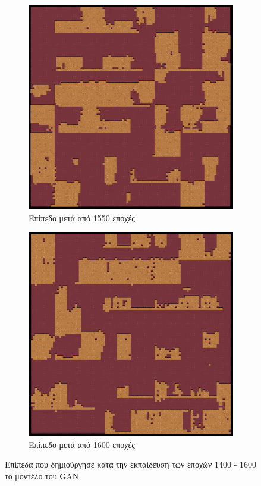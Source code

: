 \begin{figure}[H]
\begin{subfigure}{.5\textwidth}
  \centering
  \includegraphics[width=.8\linewidth]{../images/generated/1550.png}
  \caption{Επίπεδο μετά από 1550 εποχές}
  \label{fig:sfig2}
\end{subfigure}
\begin{subfigure}{.5\textwidth}
  \centering
  \includegraphics[width=.8\linewidth]{../images/generated/1600.png}
  \caption{Επίπεδο μετά από 1600 εποχές}
  \label{fig:sfig2}
\end{subfigure}
\caption{Επίπεδα που δημιούργησε κατά την εκπαίδευση των εποχών 1400 - 1600 το μοντέλο του GAN}
\label{fig:fig}
\end{figure}

